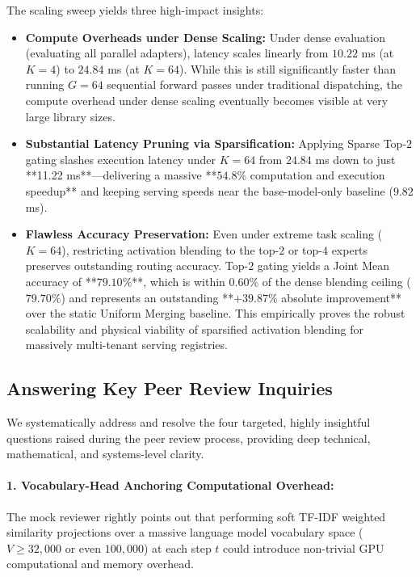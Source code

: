 \documentclass{article}
\theoremstyle{plain}
\theoremstyle{definition}
\theoremstyle{remark}
\begin{document}
The scaling sweep yields three high-impact insights:
\begin{itemize}
  \item \textbf{Compute Overheads under Dense Scaling:} Under dense evaluation (evaluating all parallel adapters), latency scales linearly from $10.22$ ms (at $K=4$) to $24.84$ ms (at $K=64$). While this is still significantly faster than running $G=64$ sequential forward passes under traditional dispatching, the compute overhead under dense scaling eventually becomes visible at very large library sizes.
  \item \textbf{Substantial Latency Pruning via Sparsification:} Applying Sparse Top-$2$ gating slashes execution latency under $K=64$ from $24.84$ ms down to just **11.22 ms**—delivering a massive **$54.8\%$ computation and execution speedup** and keeping serving speeds near the base-model-only baseline ($9.82$ ms).
  \item \textbf{Flawless Accuracy Preservation:} Even under extreme task scaling ($K=64$), restricting activation blending to the top-$2$ or top-$4$ experts preserves outstanding routing accuracy. Top-$2$ gating yields a Joint Mean accuracy of **$79.10\%$**, which is within $0.60\%$ of the dense blending ceiling ($79.70\%$) and represents an outstanding **$+39.87\%$ absolute improvement** over the static Uniform Merging baseline. This empirically proves the robust scalability and physical viability of sparsified activation blending for massively multi-tenant serving registries.
\end{itemize}

\subsection{Answering Key Peer Review Inquiries}
\label{app:reviewer_answers}

We systematically address and resolve the four targeted, highly insightful questions raised during the peer review process, providing deep technical, mathematical, and systems-level clarity.

\paragraph{1. Vocabulary-Head Anchoring Computational Overhead:} 
The mock reviewer rightly points out that performing soft TF-IDF weighted similarity projections over a massive language model vocabulary space ($V \ge 32,000$ or even $100,000$) at each step $t$ could introduce non-trivial GPU computational and memory overhead. 
\end{document}
